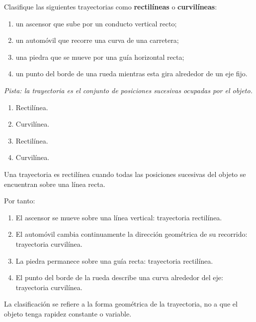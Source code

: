 \begin{ejercicio}
Clasifique las siguientes trayectorias como \textbf{rectilíneas} o \textbf{curvilíneas}:

\begin{enumerate}[label=\alph*)]
    \item un ascensor que sube por un conducto vertical recto;
    \item un automóvil que recorre una curva de una carretera;
    \item una piedra que se mueve por una guía horizontal recta;
    \item un punto del borde de una rueda mientras esta gira alrededor de un eje fijo.
\end{enumerate}

\textit{Pista: la trayectoria es el conjunto de posiciones sucesivas ocupadas por el objeto.}
\end{ejercicio}

\begin{respuesta}
\begin{enumerate}[label=\alph*)]
    \item Rectilínea.
    \item Curvilínea.
    \item Rectilínea.
    \item Curvilínea.
\end{enumerate}
\end{respuesta}

\begin{explicacion}
Una trayectoria es rectilínea cuando todas las posiciones sucesivas del objeto se encuentran sobre una línea recta.

Por tanto:

\begin{enumerate}[label=\alph*)]
    \item El ascensor se mueve sobre una línea vertical: trayectoria rectilínea.

    \item El automóvil cambia continuamente la dirección geométrica de su recorrido: trayectoria curvilínea.

    \item La piedra permanece sobre una guía recta: trayectoria rectilínea.

    \item El punto del borde de la rueda describe una curva alrededor del eje: trayectoria curvilínea.
\end{enumerate}

La clasificación se refiere a la forma geométrica de la trayectoria, no a que el objeto tenga rapidez constante o variable.
\end{explicacion}


